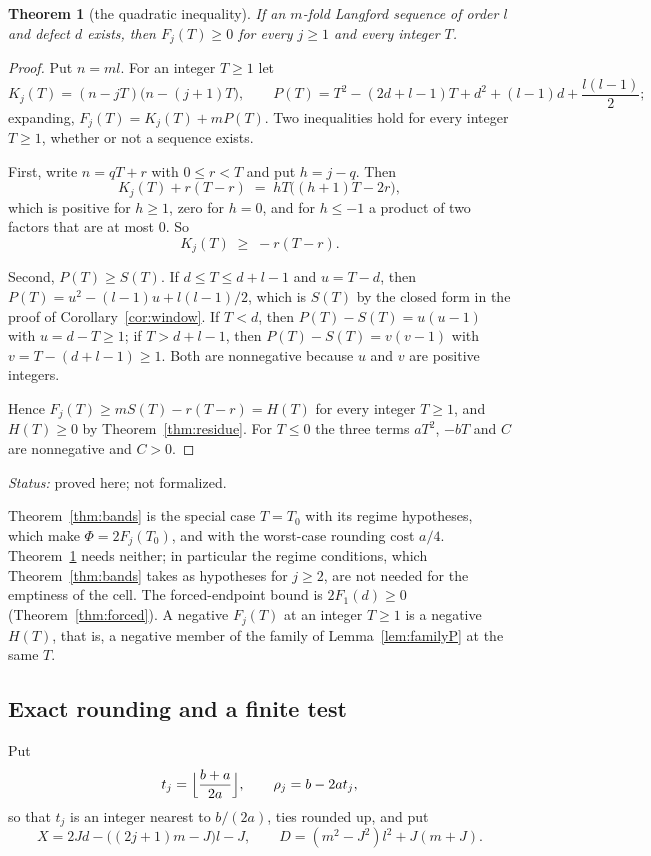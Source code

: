 \documentclass[11pt]{amsart}
\theoremstyle{plain}
\newtheorem{theorem}{Theorem}[section]
\theoremstyle{definition}
\theoremstyle{remark}
\newcommand{\status}[1]{\par\smallskip
  {\small\raggedright\noindent\textit{Status:} #1\par}\smallskip}
\begin{document}
\begin{theorem}[the quadratic inequality]\label{thm:quad}
If an $m$-fold Langford sequence of order $l$ and defect $d$ exists, then
$F_j(T) \ge 0$ for every $j \ge 1$ and every integer $T$.
\end{theorem}

\begin{proof}
Put $n = ml$. For an integer $T \ge 1$ let
\[
  K_j(T) = (n - jT)\bigl(n - (j+1)T\bigr), \qquad
  P(T) = T^2 - (2d+l-1)T + d^2 + (l-1)d + \frac{l(l-1)}{2} ;
\]
expanding, $F_j(T) = K_j(T) + mP(T)$. Two inequalities hold for every integer $T \ge 1$,
whether or not a sequence exists.

First, write $n = qT + r$ with $0 \le r < T$ and put $h = j - q$. Then
\[
  K_j(T) + r(T-r) \;=\; hT\bigl((h+1)T - 2r\bigr),
\]
which is positive for $h \ge 1$, zero for $h = 0$, and for $h \le -1$ a product of two
factors that are at most $0$. So
\begin{equation}\label{eq:Kbound}
  K_j(T) \;\ge\; -r(T-r).
\end{equation}

Second, $P(T) \ge S(T)$. If $d \le T \le d+l-1$ and $u = T - d$, then
$P(T) = u^2 - (l-1)u + l(l-1)/2$, which is $S(T)$ by the closed form in the proof of
Corollary~\ref{cor:window}. If $T < d$, then $P(T) - S(T) = u(u-1)$ with
$u = d - T \ge 1$; if $T > d+l-1$, then $P(T) - S(T) = v(v-1)$ with
$v = T - (d+l-1) \ge 1$. Both are nonnegative because $u$ and $v$ are positive integers.

Hence $F_j(T) \ge mS(T) - r(T-r) = H(T)$ for every integer $T \ge 1$, and $H(T) \ge 0$
by Theorem~\ref{thm:residue}. For $T \le 0$ the three terms $aT^2$, $-bT$ and $C$ are
nonnegative and $C > 0$.
\end{proof}
\status{proved here; not formalized.}

Theorem~\ref{thm:bands} is the special case $T = T_0$ with its regime hypotheses, which
make $\Phi = 2F_j(T_0)$, and with the worst-case rounding cost $a/4$. Theorem~\ref{thm:quad}
needs neither; in particular the regime conditions, which Theorem~\ref{thm:bands} takes
as hypotheses for $j \ge 2$, are not needed for the emptiness of the cell. The
forced-endpoint bound is $2F_1(d) \ge 0$ (Theorem~\ref{thm:forced}). A negative $F_j(T)$
at an integer $T \ge 1$ is a negative $H(T)$, that is, a negative member of the family
of Lemma~\ref{lem:familyP} at the same $T$.

\subsection*{Exact rounding and a finite test}
Put
\[
  t_j = \Bigl\lfloor \frac{b + a}{2a} \Bigr\rfloor, \qquad \rho_j = b - 2at_j,
\]
so that $t_j$ is an integer nearest to $b/(2a)$, ties rounded up, and put
\[
  X = 2Jd - \bigl((2j+1)m - J\bigr)l - J, \qquad D = (m^2 - J^2)l^2 + J(m+J).
\]
\end{document}
